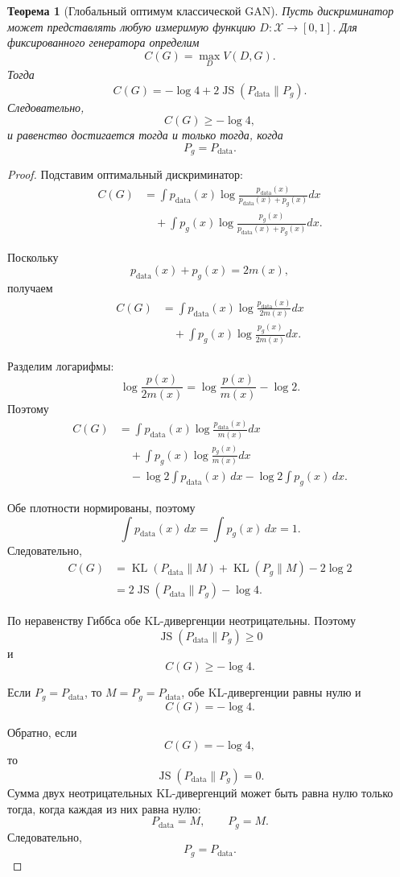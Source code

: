 \documentclass[12pt,a4paper]{article}
\newcommand{\KL}{\operatorname{KL}}
\newcommand{\JS}{\operatorname{JS}}
\numberwithin{equation}{section}
\newtheorem{theorem}{Теорема}[section]
\theoremstyle{definition}
\theoremstyle{remark}
\begin{document}
\begin{theorem}[Глобальный оптимум классической GAN]
Пусть дискриминатор может представлять любую измеримую функцию
\(D:\mathcal{X}\to[0,1]\). Для фиксированного генератора определим
\[
    C(G)=\max_D V(D,G).
\]
Тогда
\[
    C(G)
    =
    -\log4
    +
    2\JS(P_{\mathrm{data}}\|P_g).
\]
Следовательно,
\[
    C(G)\geq-\log4,
\]
и равенство достигается тогда и только тогда, когда
\[
    P_g=P_{\mathrm{data}}.
\]
\end{theorem}

\begin{proof}
Подставим оптимальный дискриминатор:
\[
\begin{split}
    C(G)
    &=
    \int
    p_{\mathrm{data}}(x)
    \log
    \frac{
        p_{\mathrm{data}}(x)
    }{
        p_{\mathrm{data}}(x)+p_g(x)
    }
    dx\\
    &\quad+
    \int
    p_g(x)
    \log
    \frac{
        p_g(x)
    }{
        p_{\mathrm{data}}(x)+p_g(x)
    }
    dx.
\end{split}
\]

Поскольку
\[
    p_{\mathrm{data}}(x)+p_g(x)=2m(x),
\]
получаем
\[
\begin{split}
    C(G)
    &=
    \int
    p_{\mathrm{data}}(x)
    \log
    \frac{
        p_{\mathrm{data}}(x)
    }{2m(x)}
    dx\\
    &\quad+
    \int
    p_g(x)
    \log
    \frac{
        p_g(x)
    }{2m(x)}
    dx.
\end{split}
\]

Разделим логарифмы:
\[
    \log\frac{p(x)}{2m(x)}
    =
    \log\frac{p(x)}{m(x)}-\log2.
\]
Поэтому
\[
\begin{split}
    C(G)
    &=
    \int
    p_{\mathrm{data}}(x)
    \log
    \frac{
        p_{\mathrm{data}}(x)
    }{m(x)}
    dx\\
    &\quad+
    \int
    p_g(x)
    \log
    \frac{
        p_g(x)
    }{m(x)}
    dx\\
    &\quad-
    \log2\int p_{\mathrm{data}}(x)\,dx
    -
    \log2\int p_g(x)\,dx.
\end{split}
\]

Обе плотности нормированы, поэтому
\[
    \int p_{\mathrm{data}}(x)\,dx
    =
    \int p_g(x)\,dx
    =1.
\]
Следовательно,
\[
\begin{split}
    C(G)
    &=
    \KL(P_{\mathrm{data}}\|M)
    +
    \KL(P_g\|M)
    -
    2\log2\\
    &=
    2\JS(P_{\mathrm{data}}\|P_g)-\log4.
\end{split}
\]

По неравенству Гиббса обе KL-дивергенции неотрицательны. Поэтому
\[
    \JS(P_{\mathrm{data}}\|P_g)\geq0
\]
и
\[
    C(G)\geq-\log4.
\]

Если \(P_g=P_{\mathrm{data}}\), то \(M=P_g=P_{\mathrm{data}}\), обе
KL-дивергенции равны нулю и
\[
    C(G)=-\log4.
\]

Обратно, если
\[
    C(G)=-\log4,
\]
то
\[
    \JS(P_{\mathrm{data}}\|P_g)=0.
\]
Сумма двух неотрицательных KL-дивергенций может быть равна нулю только
тогда, когда каждая из них равна нулю:
\[
    P_{\mathrm{data}}=M,
    \qquad
    P_g=M.
\]
Следовательно,
\[
    P_g=P_{\mathrm{data}}.
\]
\end{proof}
\end{document}
